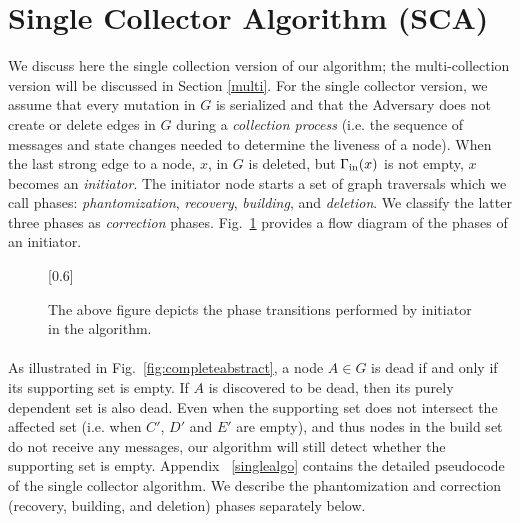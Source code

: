 \section{ Single Collector Algorithm (SCA)} 
\label{single}
We discuss here the single collection version of our algorithm; the multi-collection version will be discussed in Section \ref{multi}.
For the single collector version, we assume that every mutation in $G$ is serialized
and that the Adversary does not create or delete edges in $G$ during a \emph{collection process} (i.e. the sequence of messages and
state changes needed to determine the liveness of a node).
When the last strong edge to a node, $x$, in $G$ is deleted, but $\Gamma_{\rm in}(x)$ is not empty,
$x$ becomes an {\em initiator}. %
The initiator node starts a set of graph traversals which we call phases:
{\em phantomization}, {\em recovery}, {\em building}, and {\em deletion}. We classify the latter three
phases as {\em correction} phases.
Fig.~\ref{fig:state} provides a flow diagram of the phases of an initiator. 
\begin{figure}
\centering
\scalebox{0.6}[0.6]{}
\caption{The above figure depicts the phase transitions performed by initiator in the algorithm.
}
\label{fig:state}

\end{figure}



\paragraph{}


As illustrated in Fig.~\ref{fig:completeabstract}, a node $A\in G$ is dead if and only if its supporting set
is empty. If $A$ is discovered to be dead, then its purely dependent set is also
dead. %
Even when the supporting set does
not intersect the affected set (i.e. when $C'$, $D'$ and $E'$ are empty), and thus
nodes in the build set do not receive any messages, our algorithm will still detect whether the
supporting set is empty. Appendix ~\ref{singlealgo} contains the detailed pseudocode of the single collector algorithm. We describe the phantomization and correction (recovery, building, and deletion) phases separately below.

